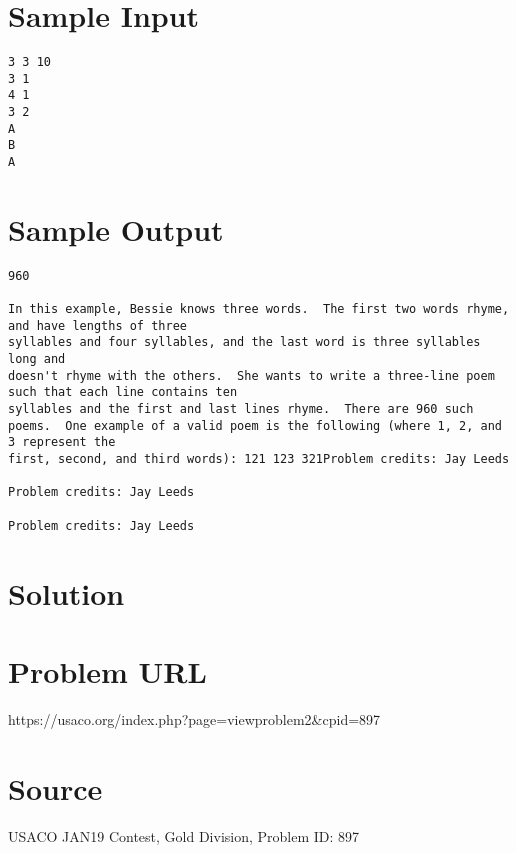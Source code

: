 \documentclass[12pt]{article}
\begin{document}
\section*{Sample Input}
\begin{verbatim}
3 3 10
3 1
4 1
3 2
A
B
A
\end{verbatim}

\section*{Sample Output}
\begin{verbatim}
960

In this example, Bessie knows three words.  The first two words rhyme, and have lengths of three
syllables and four syllables, and the last word is three syllables long and
doesn't rhyme with the others.  She wants to write a three-line poem such that each line contains ten
syllables and the first and last lines rhyme.  There are 960 such poems.  One example of a valid poem is the following (where 1, 2, and 3 represent the
first, second, and third words): 121 123 321Problem credits: Jay Leeds

Problem credits: Jay Leeds

Problem credits: Jay Leeds
\end{verbatim}

\section*{Solution}


\section*{Problem URL}
https://usaco.org/index.php?page=viewproblem2&cpid=897

\section*{Source}
USACO JAN19 Contest, Gold Division, Problem ID: 897
\end{document}
